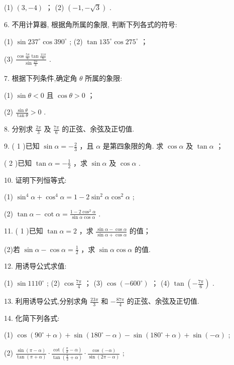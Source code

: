\documentclass[10pt]{article}
\begin{document}
(1) \(\left( {3, - 4}\right)\) ； (2) \(\left( {-1, - \sqrt{3}}\right)\) .

6. 不用计算器, 根据角所属的象限, 判断下列各式的符号:

(1) \(\sin {237}^{ \circ  }\cos {390}^{ \circ  }\) ; (2) \(\tan {135}^{ \circ  }\cos {275}^{ \circ  }\) ；

(3) \(\frac{\cos \frac{5\pi }{6}\tan \frac{11\pi }{6}}{\sin \frac{2\pi }{3}}\) .

7. 根据下列条件,确定角 \(\theta\) 所属的象限:

(1) \(\sin \theta  < 0\) 且 \(\cos \theta  > 0\) ；

(2) \(\frac{\sin \theta }{\tan \theta } > 0\) .

8. 分别求 \(\frac{2\pi }{3}\) 及 \(\frac{7\pi }{6}\) 的正弦、余弦及正切值.

9. ( 1 )已知 \(\sin \alpha  =  - \frac{2}{3}\) ，且 \(\alpha\) 是第四象限的角. 求 \(\cos \alpha\) 及 \(\tan \alpha\) ；

( 2 )已知 \(\tan \alpha  =  - \frac{1}{2}\) ，求 \(\sin \alpha\) 及 \(\cos \alpha\) .

10. 证明下列恒等式:

(1) \({\sin }^{4}\alpha  + {\cos }^{4}\alpha  = 1 - 2{\sin }^{2}\alpha {\cos }^{2}\alpha\) ;

(2) \(\tan \alpha  - \cot \alpha  = \frac{1 - 2{\cos }^{2}\alpha }{\sin \alpha \cos \alpha }\) .

11. ( 1 )已知 \(\tan \alpha  = 2\) ，求 \(\frac{\sin \alpha  - \cos \alpha }{\sin \alpha  + \cos \alpha }\) 的值；

(2)若 \(\sin \alpha  - \cos \alpha  = \frac{1}{2}\) ，求 \(\sin \alpha \cos \alpha\) 的值.

12. 用诱导公式求值:

(1) \(\sin {1110}^{ \circ  }\) ; (2) \(\cos \frac{7\pi }{4}\) ； (3) \(\cos \left( {-{600}^{ \circ  }}\right)\) ； (4) \(\tan \left( {-\frac{7\pi }{6}}\right)\) .

13. 利用诱导公式,分别求角 \(\frac{23\pi }{3}\) 和 \(- \frac{87\pi }{4}\) 的正弦、余弦及正切值.

14. 化简下列各式:

(1) \(\cos \left( {{90}^{ \circ  } + \alpha }\right)  + \sin \left( {{180}^{ \circ  } - \alpha }\right)  - \sin \left( {{180}^{ \circ  } + \alpha }\right)  + \sin \left( {-\alpha }\right)\) ;

(2) \(\frac{\sin \left( {\pi  - \alpha }\right) }{\tan \left( {\pi  + \alpha }\right) } \cdot  \frac{\cot \left( {\frac{\pi }{2} - \alpha }\right) }{\tan \left( {\frac{\pi }{2} + \alpha }\right) } \cdot  \frac{\cos \left( {-\alpha }\right) }{\sin \left( {{2\pi } - \alpha }\right) }\) ;
\end{document}
